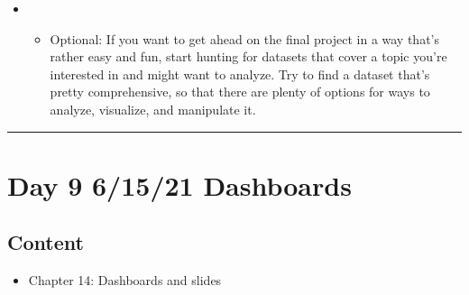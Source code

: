 \documentclass[letterpaper,10pt,english]{jupyterBook}
\begin{document}
\sphinxAtStartPar
{}
\begin{itemize}
\item {} 
\sphinxAtStartPar
{}
\begin{itemize}
\item {} 
\sphinxAtStartPar
Optional: If you want to get ahead on the final project in a way that’s rather easy and fun, start hunting for datasets that cover a topic you’re interested in and might want to analyze.  Try to find a dataset that’s pretty comprehensive, so that there are plenty of options for ways to analyze, visualize, and manipulate it.

\end{itemize}

\end{itemize}


\bigskip\hrule\bigskip



\section{Day 9 \sphinxhyphen{} 6/15/21 \sphinxhyphen{} Dashboards}
\label{\detokenize{course-schedule:day-9-6-15-21-dashboards}}

\subsection{Content}
\label{\detokenize{course-schedule:id15}}\begin{itemize}
\item {} 
\sphinxAtStartPar
Chapter 14: Dashboards \sphinxhyphen{} {\hyperref[\detokenize{chapter-14-dashboards::doc}]{}} and slides

\end{itemize}
\end{document}
